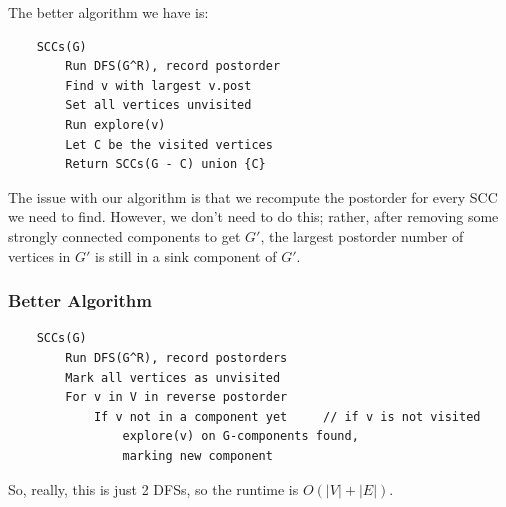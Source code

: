 \documentclass[letterpaper]{article}
\begin{document}
The better algorithm we have is: 
\begin{verbatim}
    SCCs(G)
        Run DFS(G^R), record postorder 
        Find v with largest v.post 
        Set all vertices unvisited 
        Run explore(v)
        Let C be the visited vertices 
        Return SCCs(G - C) union {C}
\end{verbatim}

The issue with our algorithm is that we recompute the postorder for every SCC we need to find. However, we don't need to do this; rather, after removing some strongly connected components to get $G'$, the largest postorder number of vertices in $G'$ is still in a sink component of $G'$. 

\subsubsection{Better Algorithm}
\begin{verbatim}
    SCCs(G)
        Run DFS(G^R), record postorders
        Mark all vertices as unvisited 
        For v in V in reverse postorder 
            If v not in a component yet     // if v is not visited 
                explore(v) on G-components found,
                marking new component 
\end{verbatim}

So, really, this is just 2 DFSs, so the runtime is $O(|V| + |E|)$. 

















\newpage 
\end{document}
